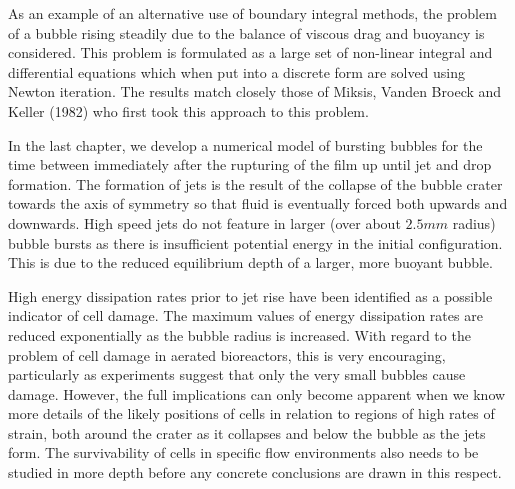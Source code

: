 As an example of an alternative use of boundary integral methods, the problem
of a bubble rising steadily due to the balance of viscous drag and buoyancy is
considered. This problem is formulated as a large set of non-linear integral
and differential equations which when put into a discrete form 
are solved using Newton iteration. The results match closely those
of Miksis, Vanden Broeck and Keller (1982) who first took this approach
to this problem.

In the last chapter, we develop a numerical model of bursting bubbles 
for the time 
between immediately after the rupturing of the film up until jet and 
drop formation.
The formation of jets is the result of the
collapse of the bubble crater towards the axis of symmetry so that fluid is
eventually forced both upwards and downwards.
High speed jets do not feature in larger (over about $2.5mm$ radius) bubble
bursts as there is insufficient potential energy in the initial configuration.
This is due to the reduced equilibrium depth of a larger, more buoyant
bubble.

High energy dissipation rates prior to jet rise
have been identified as a possible indicator of cell damage.
The maximum values of energy dissipation rates are reduced 
exponentially as the bubble radius is increased.
With regard to the problem of cell damage 
in aerated bioreactors, this is very encouraging, particularly as 
experiments suggest that only the very small bubbles cause damage. However,
the full implications can only become apparent when we know
more details of the likely positions of cells in relation to
regions of high rates of strain, both around the crater as it collapses and
below the bubble as the jets form.
The survivability of cells in specific flow environments also needs
to be studied in more depth before any concrete conclusions are 
drawn in this respect.

